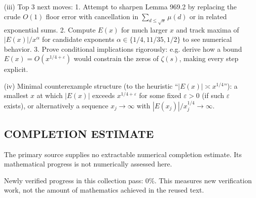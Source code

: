 (iii) Top 3 next moves:
1. Attempt to sharpen Lemma 969.2 by replacing the crude $O(1)$ floor error with cancellation in $\sum_{d\le\sqrt x}\mu(d)$ or in related exponential sums.
2. Compute $E(x)$ for much larger $x$ and track maxima of $|E(x)|/x^{\alpha}$ for candidate exponents $\alpha\in\{1/4,11/35,1/2\}$ to see numerical behavior.
3. Prove conditional implications rigorously: e.g. derive how a bound $E(x)=O(x^{1/4+\varepsilon})$ would constrain the zeros of $\zeta(s)$, making every step explicit.

(iv) Minimal counterexample structure (to the heuristic “$|E(x)|\asymp x^{1/4}$”): a smallest $x$ at which $|E(x)|$ exceeds $x^{1/4+\varepsilon}$ for some fixed $\varepsilon>0$ (if such $\varepsilon$ exists), or alternatively a sequence $x_j\to\infty$ with $|E(x_j)|/x_j^{1/4}\to\infty$.


\subsection*{COMPLETION ESTIMATE}
The primary source supplies no extractable numerical completion estimate. Its mathematical progress is not numerically assessed here.

Newly verified progress in this collection pass: $0\%$. This measures new verification work, not the amount of mathematics achieved in the reused text.
